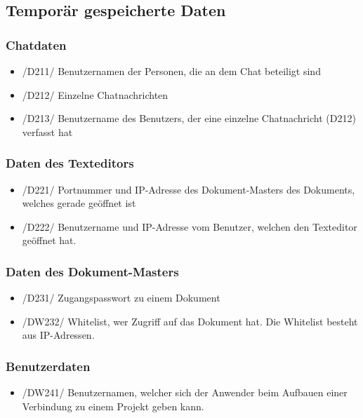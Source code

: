 \documentclass{scrartcl}
\begin{document}
\subsection{Temporär gespeicherte Daten}

\subsubsection{Chatdaten}
\begin{itemize}
\item /D211/ Benutzernamen der Personen, die an dem Chat beteiligt sind
\item /D212/ Einzelne Chatnachrichten
\item /D213/ Benutzername des Benutzers, der eine einzelne Chatnachricht (D212) verfasst hat
 \end{itemize}

\subsubsection{Daten des Texteditors}
\begin{itemize}
\item /D221/ Portnummer und IP-Adresse des Dokument-Masters des Dokuments, welches gerade geöffnet ist
\item /D222/ Benutzername und IP-Adresse vom Benutzer, welchen den Texteditor geöffnet hat.
\end{itemize}

\subsubsection{Daten des Dokument-Masters}
\begin {itemize}
\item /D231/ Zugangspasswort zu einem Dokument 
\item /DW232/ Whitelist, wer Zugriff auf das Dokument hat. Die Whitelist besteht aus IP-Adressen.
\end{itemize}

\subsubsection{Benutzerdaten}
\begin{itemize}
\item /DW241/ Benutzernamen, welcher sich der Anwender beim Aufbauen einer Verbindung zu einem Projekt geben kann.
\end{itemize}
\end{document}
